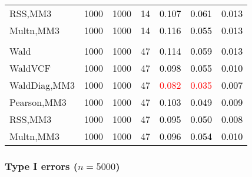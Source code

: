 \documentclass[
]{article}
\begin{document}
\begin{table}[H]
{\begin{tabular}[t]{lrrrrrr}
\hspace{1em}RSS,MM3 & 1000 & 1000 & 14 & \textcolor{black}{0.107} & \textcolor{black}{0.061} & \textcolor{black}{0.013}\\
\hspace{1em}Multn,MM3 & 1000 & 1000 & 14 & \textcolor{black}{0.116} & \textcolor{black}{0.055} & \textcolor{black}{0.013}\\
\addlinespace[0.3em]
\multicolumn{7}{l}{\textbf{3F 15V}}\\
\hspace{1em}Wald & 1000 & 1000 & 47 & \textcolor{black}{0.114} & \textcolor{black}{0.059} & \textcolor{black}{0.013}\\
\hspace{1em}WaldVCF & 1000 & 1000 & 47 & \textcolor{black}{0.098} & \textcolor{black}{0.055} & \textcolor{black}{0.010}\\
\hspace{1em}WaldDiag,MM3 & 1000 & 1000 & 47 & \textcolor{red}{0.082} & \textcolor{red}{0.035} & \textcolor{black}{0.007}\\
\hspace{1em}Pearson,MM3 & 1000 & 1000 & 47 & \textcolor{black}{0.103} & \textcolor{black}{0.049} & \textcolor{black}{0.009}\\
\hspace{1em}RSS,MM3 & 1000 & 1000 & 47 & \textcolor{black}{0.095} & \textcolor{black}{0.050} & \textcolor{black}{0.008}\\
\hspace{1em}Multn,MM3 & 1000 & 1000 & 47 & \textcolor{black}{0.096} & \textcolor{black}{0.054} & \textcolor{black}{0.010}\\
\bottomrule
\end{tabular}}
\endgroup{}
\end{table}

\subsubsection{\texorpdfstring{Type I errors
(\(n=5000\))}{Type I errors (n=5000)}}\label{type-i-errors-n5000-2}
\end{document}
